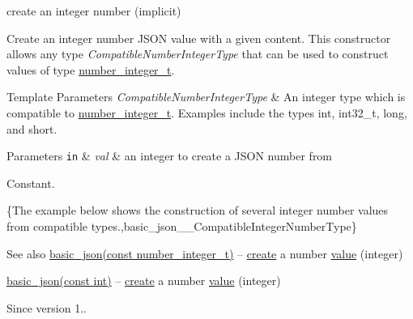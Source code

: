 create an integer number (implicit) 

Create an integer number J\+S\+ON value with a given content. This constructor allows any type {\itshape Compatible\+Number\+Integer\+Type} that can be used to construct values of type \hyperlink{classnlohmann_1_1basic__json_ac4b10b2364f26ce47bdb9a413ff04a59}{number\+\_\+integer\+\_\+t}.


\begin{DoxyTemplParams}{Template Parameters}
{\em Compatible\+Number\+Integer\+Type} & An integer type which is compatible to \hyperlink{classnlohmann_1_1basic__json_ac4b10b2364f26ce47bdb9a413ff04a59}{number\+\_\+integer\+\_\+t}. Examples include the types {\ttfamily int}, {\ttfamily int32\+\_\+t}, {\ttfamily long}, and {\ttfamily short}.\\
\hline
\end{DoxyTemplParams}

\begin{DoxyParams}[1]{Parameters}
\mbox{\tt in}  & {\em val} & an integer to create a J\+S\+ON number from\\
\hline
\end{DoxyParams}
Constant.

\{The example below shows the construction of several integer number values from compatible types.,basic\+\_\+json\+\_\+\+\_\+\+Compatible\+Integer\+Number\+Type\}

\begin{DoxySeeAlso}{See also}
\hyperlink{classnlohmann_1_1basic__json_a0d838bc7ffca6017f51167e0a8ffd9b6}{basic\+\_\+json(const number\+\_\+integer\+\_\+t)} -- \hyperlink{classnlohmann_1_1basic__json_afdb7a485369fbfd8c4c7c134ebb1feb5}{create} a number \hyperlink{classnlohmann_1_1basic__json_a407e73a037e6e3067ef7aa2c25a79f39}{value} (integer) 

\hyperlink{classnlohmann_1_1basic__json_a70ae1f0747f5b7a89979512866474f1a}{basic\+\_\+json(const int)} -- \hyperlink{classnlohmann_1_1basic__json_afdb7a485369fbfd8c4c7c134ebb1feb5}{create} a number \hyperlink{classnlohmann_1_1basic__json_a407e73a037e6e3067ef7aa2c25a79f39}{value} (integer)
\end{DoxySeeAlso}
\begin{DoxySince}{Since}
version 1.. 
\end{DoxySince}
\hypertarget{classnlohmann_1_1basic__json_a85b09b03916d3d1e73373f49cdd4136d}{}\label{classnlohmann_1_1basic__json_a85b09b03916d3d1e73373f49cdd4136d} 
